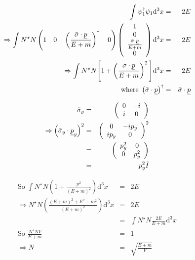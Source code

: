 \begin{eqnarray*}
  \int \psi_1^{\dagger}\psi_1\mathrm{d}^3x & = & 2E \\
  \Rightarrow \int N^{\star}N\left( 1 \quad 0 \quad \left(\frac{\bar{\sigma}\cdot\underline{p}}{E + m}\right)^{\dagger} \quad 0 \right)
  \left(
    \begin{array}{c}
    1 \\
    0 \\
    \frac{\bar{\sigma}\cdot\underline{p}}{E + m} \\
    0
    \end{array}
  \right)
  \mathrm{d}^3x & = & 2E
  \\
  \Rightarrow \int N^{\star}N\Bigg[ 1 + \left( \frac{\bar{\sigma}\cdot\underline{p}}{E + m} \right)^2 \Bigg]\mathrm{d}^3x & = & 2E \\
  \textrm{where } \left(\bar{\sigma}\cdot\underline{p}\right)^{\dagger} & = & \bar{\sigma}\cdot\underline{p}
\end{eqnarray*}

\begin{eqnarray*}
  \bar{\sigma}_y & = &
  \left(
    \begin{array}{cc}
    0 & -i \\
    i & 0
    \end{array}
  \right)
  \\
  \Rightarrow
  \left(
  \bar{\sigma}_y\cdot\underline{p}_y\right)^2 & = &
  \left(
    \begin{array}{cc}
    0 & -ip_y \\
    ip_y & 0
    \end{array}
  \right)^2
  \\
  & = &
  \left(
    \begin{array}{cc}
    p_y^2 & 0 \\
    0 & p_y^2
    \end{array}
  \right)
  \\
  & = & p_y^2 \bar{I}
\end{eqnarray*}

\begin{eqnarray*}
  \textrm{So } \int N^{\star}N\left( 1 + \frac{p^2}{\left(E + m\right)^2}\right)\mathrm{d}^3x & = & 2E \\
  \Rightarrow N^{\star}N\left(\frac{\left(E + m\right)^2 + E^2 - m^2}{\left(E + m\right)^2}\right)\mathrm{d}^3x & = & 2E \\
  & = & \int N^{\star}N\frac{2E}{E + m}\mathrm{d}^3 x \\
  \textrm{So } \frac{N^{\star}NV}{E + m} & = & 1 \\
  \Rightarrow N & = & \sqrt{\frac{E + m}{V}}
\end{eqnarray*}


